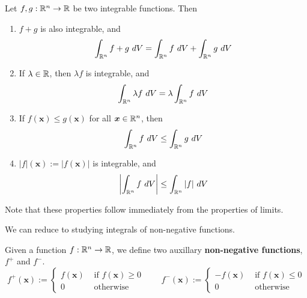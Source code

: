 \begin{theorem}
    
    Let $f, g : \mathbb{R}^n \to \mathbb{R}$ be two integrable functions.  Then
    
    \begin{enumerate}
        \item $f+g$ is also integrable, and
        $$\int_{\R^n} f+g \ dV = \int_{\R^n} f \ dV + \int_{\R^n} g \ dV$$
        \item If $\lambda \in \mathbb{R}$, then $\lambda f$ is integrable, and 
        $$\int_{\R^n} \lambda f \ dV = \lambda \int_{\R^n} f \ dV$$
        \item If $f(\bm{x}) \leq g(\bm{x})$ for all $\bm{x} \in \mathbb{R}^n$, then $$\int_{\R^n} f \ dV \leq \int_{\R^n} g \ dV$$
        \item $|f|(\bm{x}) := |f(\bm{x})|$ is integrable, and $$\left|\int_{\R^n} f \ dV\right| \leq \int_{\R^n} |f| \ dV$$
    \end{enumerate}
    
    \end{theorem}

    Note that these properties follow immediately from the properties of limits.

    \begin{corollary}
    We can reduce to studying integrals of non-negative functions.
    \end{corollary}
    
    \begin{definition}
    Given a function $f : \mathbb{R}^n \to \mathbb{R}$, we define two auxillary \textbf{non-negative functions}, $f^+$ and $f^-$.
    $$f^+(\bm{x}) := \left\{
		\begin{array}{ll}
			f(\bm{x}) & \text{ if } f(\bm{x}) \geq 0 \\
			0 & \text{ otherwise}
		\end{array}
		\right. \qquad f^-(\bm{x}) := \left\{
		\begin{array}{ll}
			-f(\bm{x}) & \text{ if } f(\bm{x}) \leq 0 \\
			0 & \text{ otherwise}
		\end{array}
		\right.$$
    
    \end{definition}

